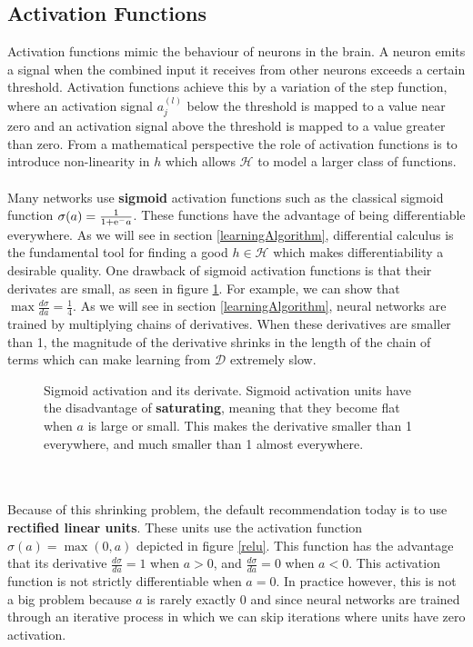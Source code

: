 \subsection{Activation Functions}
\label{activation_functions}
Activation functions mimic the behaviour of neurons in the brain. A neuron emits a signal when the combined input it receives from other neurons exceeds a certain threshold. Activation functions achieve this by a variation of the step function, where an activation signal $a^{(l)}_j$ below the threshold is mapped to a value near zero and an activation signal above the threshold is mapped to a value greater than zero. From a mathematical perspective the role of activation functions is to introduce non-linearity in $h$ which allows $\mathcal{H}$ to model a larger class of functions.
\\\\
Many networks use \textbf{sigmoid} activation functions such as the classical sigmoid function $\sigma(a) = \frac{1}{1 + \mathrm{e}^-a}$. These functions have the advantage of being differentiable everywhere. As we will see in section \ref{learningAlgorithm}, differential calculus is the fundamental tool for finding a good $h \in \mathcal{H}$ which makes differentiability a desirable quality. One drawback of sigmoid activation functions is that their derivates are small, as seen in figure \ref{sigmoid}. For example, we can show that $\max \frac{d\sigma}{da} = \frac{1}{4}$. As we will see in section \ref{learningAlgorithm}, neural networks are trained by multiplying chains of derivatives. When these derivatives are smaller than 1, the magnitude of the derivative shrinks in the length of the chain of terms which can make learning from $\mathcal{D}$ extremely slow.
\begin{figure}
	\centering
	
	\caption{Sigmoid activation and its derivate. Sigmoid activation units have the disadvantage of \textbf{saturating}, meaning that they become flat when $a$ is large or small. This makes the derivative smaller than 1 everywhere, and much smaller than 1 almost everywhere.}
	\label{sigmoid}
\end{figure}
\\\\
Because of this shrinking problem, the default recommendation today is to use \textbf{rectified linear units}. These units use the activation function $\sigma(a) = \max(0, a)$ depicted in figure \ref{relu}. This function has the advantage that its derivative $\frac{d\sigma}{da} = 1$ when $a > 0$, and $\frac{d\sigma}{da} = 0$ when $a < 0$. This activation function is not strictly differentiable when $a = 0$. In practice however, this is not a big problem because $a$ is rarely exactly 0 and since neural networks are trained through an iterative process in which we can skip iterations where units have zero activation.
